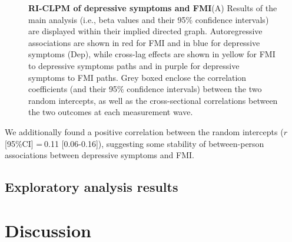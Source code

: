 \documentclass[
  letterpaper,
  DIV=11,
  numbers=noendperiod]{scrreport}
\begin{document}
\begin{figure}[H]


\caption{\label{fig-6.2}\textbf{RI-CLPM of depressive symptoms and
FMI}\newline(A) Results of the main analysis (i.e., beta values and
their 95\% confidence intervals) are displayed within their implied
directed graph. Autoregressive associations are shown in red for FMI and
in blue for depressive symptoms (Dep), while cross-lag effects are shown
in yellow for FMI to depressive symptoms paths and in purple for
depressive symptoms to FMI paths. Grey boxed enclose the correlation
coefficients (and their 95\% confidence intervals) between the two
random intercepts, as well as the cross-sectional correlations between
the two outcomes at each measurement wave.}

\end{figure}%

We additionally found a positive correlation between the random
intercepts (\(r\) {[}95\%CI{]} = 0.11 {[}0.06-0.16{]}), suggesting some
stability of between-person associations between depressive symptoms and
FMI.

\subsection{Exploratory analysis
results}\label{exploratory-analysis-results}

\section{Discussion}\label{discussion-4}
\end{document}
